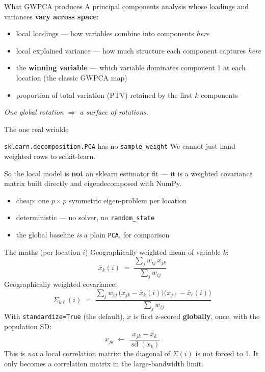 \documentclass[10pt]{beamer}
\begin{document}
\begin{frame}{What GWPCA produces}
  A principal components analysis whose loadings and variances
  \textbf{vary across space}:
  \begin{itemize}
    \item local loadings --- how variables combine into components
      \emph{here}
    \item local explained variance --- how much structure each component
      captures \emph{here}
    \item the \textbf{winning variable} --- which variable dominates
      component 1 at each location (the classic GWPCA map)
    \item proportion of total variation (PTV) retained by the first
      $k$ components
  \end{itemize}
  \vfill
  \centering
  \textit{One global rotation $\Rightarrow$ a surface of rotations.}
\end{frame}

\begin{frame}{The one real wrinkle}
  \begin{block}{\texttt{sklearn.decomposition.PCA} has no \texttt{sample\_weight}}
    We cannot just hand weighted rows to scikit-learn.
  \end{block}
  \vspace{0.5em}
  So the local model is \textbf{not} an sklearn estimator fit --- it is a
  weighted covariance matrix built directly and eigendecomposed with NumPy.
  \begin{itemize}
    \item cheap: one $p \times p$ symmetric eigen-problem per location
    \item deterministic --- no solver, no \texttt{random\_state}
    \item the global baseline \emph{is} a plain \texttt{PCA}, for comparison
  \end{itemize}
\end{frame}

\begin{frame}{The maths (per location $i$)}
  Geographically weighted mean of variable $k$:
  \[
    \bar{x}_k(i) \;=\; \frac{\sum_j w_{ij}\, x_{jk}}{\sum_j w_{ij}}
  \]
  Geographically weighted covariance:
  \[
    \Sigma_{k\ell}(i) \;=\;
      \frac{\sum_j w_{ij}\,\bigl(x_{jk}-\bar{x}_k(i)\bigr)
                          \bigl(x_{j\ell}-\bar{x}_\ell(i)\bigr)}
           {\sum_j w_{ij}}
  \]
  With \texttt{standardize=True} (the default), $x$ is first z-scored
  \textbf{globally}, once, with the population SD:
  \[
    x_{jk} \;\leftarrow\; \frac{x_{jk} - \bar{x}_k}{\operatorname{sd}(x_k)}
  \]
  \footnotesize This is \emph{not} a local correlation matrix: the diagonal of
  $\Sigma(i)$ is not forced to 1. It only becomes a correlation matrix in the
  large-bandwidth limit.
\end{frame}
\end{document}
